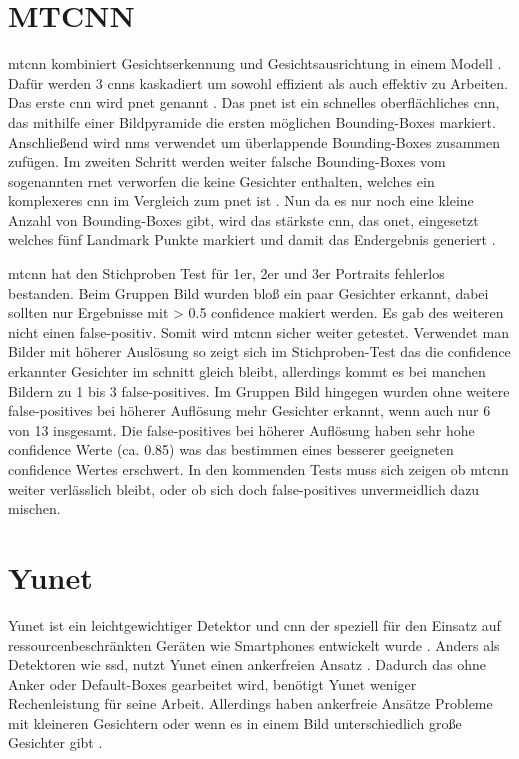\section{MTCNN}
\gls{mtcnn} kombiniert Gesichtserkennung und Gesichtsausrichtung in einem Modell \parencite{ZhangZL016}. Dafür werden 3 \gls{cnn}s kaskadiert um sowohl effizient als auch effektiv zu Arbeiten. Das erste \gls{cnn} wird \gls{pnet} genannt \parencite{ZhangZL016}. Das \gls{pnet} ist ein schnelles oberflächliches \gls{cnn}, das mithilfe einer Bildpyramide die ersten möglichen Bounding-Boxes markiert. Anschließend wird \gls{nms} verwendet um überlappende Bounding-Boxes zusammen zufügen. Im zweiten Schritt werden weiter falsche Bounding-Boxes vom sogenannten \gls{rnet} verworfen die keine Gesichter enthalten, welches ein komplexeres \gls{cnn} im Vergleich zum \gls{pnet} ist \parencite{ZhangZL016}. Nun da es nur noch eine kleine Anzahl von Bounding-Boxes gibt, wird das stärkste \gls{cnn}, das \gls{onet}, eingesetzt welches fünf Landmark Punkte markiert und damit das Endergebnis generiert \parencite{ZhangZL016}.

\gls{mtcnn} hat den Stichproben Test für 1er, 2er und 3er Portraits fehlerlos bestanden. Beim Gruppen Bild wurden bloß ein paar Gesichter erkannt, dabei sollten nur Ergebnisse mit > 0.5 confidence makiert werden. Es gab des weiteren nicht einen false-positiv. Somit wird \gls{mtcnn} sicher weiter getestet. Verwendet man Bilder mit höherer Auslösung so zeigt sich im Stichproben-Test das die confidence erkannter Gesichter im schnitt gleich bleibt, allerdings kommt es bei manchen Bildern zu 1 bis 3 false-positives. Im Gruppen Bild hingegen wurden ohne weitere false-positives bei höherer Auflösung mehr Gesichter erkannt, wenn auch nur 6 von 13 insgesamt. Die false-positives bei höherer Auflösung haben sehr hohe confidence Werte (ca. 0.85) was das bestimmen eines besserer geeigneten confidence Wertes erschwert. In den kommenden Tests muss sich zeigen ob \gls{mtcnn} weiter verlässlich bleibt, oder ob sich doch false-positives unvermeidlich dazu mischen.

\section{Yunet}
Yunet ist ein leichtgewichtiger Detektor und \gls{cnn} der speziell für den Einsatz auf ressourcenbeschränkten Geräten wie Smartphones entwickelt wurde \parencite{wu2023yunet}. Anders als Detektoren wie \gls{ssd}, nutzt Yunet einen ankerfreien Ansatz \parencite{wu2023yunet}. Dadurch das ohne Anker oder Default-Boxes gearbeitet wird, benötigt Yunet weniger Rechenleistung für seine Arbeit. Allerdings haben ankerfreie Ansätze Probleme mit kleineren Gesichtern oder wenn es in einem Bild unterschiedlich große Gesichter gibt \parencite{Wang2018}.


